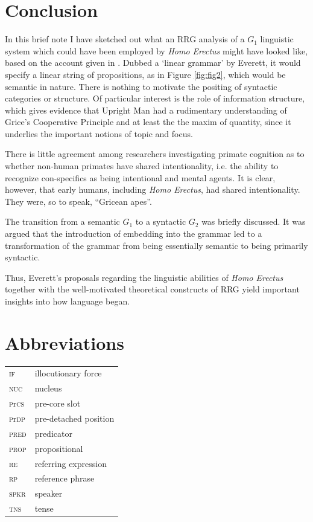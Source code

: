 \documentclass[output=paper,colorlinks,citecolor=brown]{langscibook}
\begin{document}
\section{Conclusion}\label{sec:vanvalin:6}
In this brief note I have sketched out what an RRG analysis of a $G_1$ linguistic system which could have been employed by \emph{Homo Erectus} might have looked like, based on the account given in \citet{everett2017language}.  Dubbed a ‘linear grammar’ by Everett, it would specify a linear string of propositions, as in Figure \ref{fig:fig2}, which would be semantic in nature.  There is nothing to motivate the positing of syntactic categories or structure.  Of particular interest is the role of information structure, which gives evidence that Upright Man had a rudimentary understanding of Grice’s Cooperative Principle and at least the the maxim of quantity, since it underlies the important notions of topic and focus.  

There is little agreement among researchers investigating primate cognition as to whether non-human primates have shared intentionality, i.e. the ability to recognize con-specifics as being intentional and mental agents.  It is clear, however, that early humans, including \emph{Homo Erectus}, had shared intentionality.  They were, so to speak, “Gricean apes”.

The transition from a semantic $G_1$ to a syntactic $G_2$ was briefly discussed.  It was argued that the introduction of embedding into the grammar led to a transformation of the grammar from being essentially semantic to being primarily syntactic.

Thus, Everett’s proposals regarding the linguistic abilities of \emph{Homo Erectus} together with the well-motivated theoretical constructs of RRG yield important insights into how language began.

\section*{Abbreviations}
\begin{tabularx}{.5\textwidth}{@{}lQ@{}}
\textsc{if} & illocutionary force \\
\textsc{nuc} & nucleus \\
\textsc{p}r\textsc{cs} & pre-core slot \\
\textsc{p}r\textsc{dp} & pre-detached position \\
\textsc{pred} & predicator \\
\textsc{prop} & propositional \\
\textsc{re} & referring expression \\
\textsc{rp} & reference phrase \\
\textsc{spkr} & speaker \\
\textsc{tns} & tense \\
\end{tabularx}

\printbibliography[heading=subbibliography,notkeyword=this]
\end{document}
